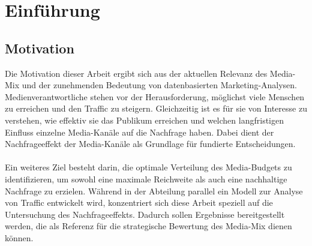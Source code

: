 
\newpage
\section{Einführung}
\label{Einführung}
\subsection{Motivation}
Die Motivation dieser Arbeit ergibt sich aus der aktuellen Relevanz des Media-Mix und der zunehmenden Bedeutung von datenbasierten Marketing-Analysen. Medienverantwortliche stehen vor der Herausforderung, möglichst viele Menschen zu erreichen und den Traffic zu steigern. Gleichzeitig ist es für sie von Interesse zu verstehen, wie effektiv sie das Publikum erreichen und welchen langfristigen Einfluss einzelne Media-Kanäle auf die Nachfrage haben. Dabei dient der Nachfrageeffekt der Media-Kanäle als Grundlage für fundierte Entscheidungen.\\\\
Ein weiteres Ziel besteht darin, die optimale Verteilung des Media-Budgets zu identifizieren, um sowohl eine maximale Reichweite als auch eine nachhaltige Nachfrage zu erzielen. Während in der Abteilung parallel ein Modell zur Analyse von Traffic entwickelt wird, konzentriert sich diese Arbeit speziell auf die Untersuchung des Nachfrageeffekts. Dadurch sollen Ergebnisse bereitgestellt werden, die als Referenz für die strategische Bewertung des Media-Mix dienen können. \\
